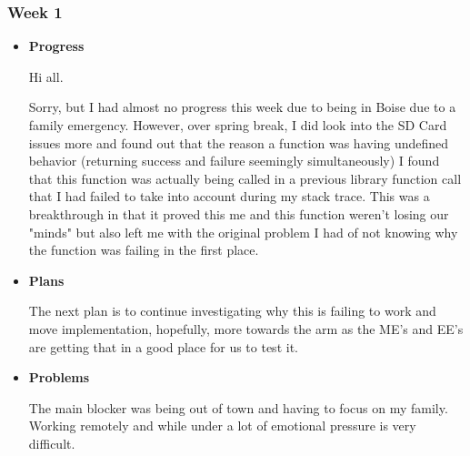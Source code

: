 \subsubsection{Week 1}
\begin{itemize}
\item{
	\textbf{Progress}

	Hi all.

	Sorry, but I had almost no progress this week due to being in Boise due to a family emergency. However, over spring break,
	 I did look into the SD Card issues more and found out that the reason a function was having undefined behavior (returning
	  success and failure seemingly simultaneously) I found that this function was actually being called in a previous library 
	  function call that I had failed to take into account during my stack trace. This was a breakthrough in that it proved 
	  this me and this function weren't losing our "minds" but also left me with the original problem I had of not knowing why 
	  the function was failing in the first place.

}


\item{
	\textbf{Plans}


	The next plan is to continue investigating why this is failing to work and move implementation, hopefully, more
	 towards the arm as the ME's and EE's are getting that in a good place for us to test it.
}


\item{
	\textbf{Problems}


	The main blocker was being out of town and having to focus on my family. Working remotely and while under a lot of 
	emotional pressure is very difficult.
}
\end{itemize}

